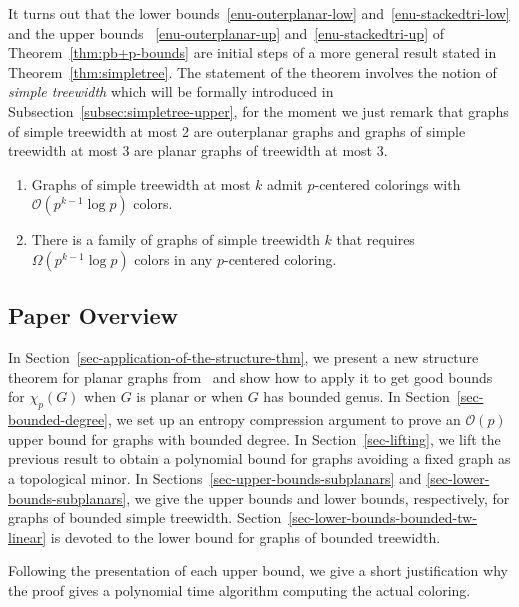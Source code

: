It turns out that the lower bounds~\ref{enu-outerplanar-low} and~\ref{enu-stackedtri-low}
and the upper bounds ~\ref{enu-outerplanar-up} and~\ref{enu-stackedtri-up} of Theorem~\ref{thm:pb+p-bounds} are initial steps of a more general result stated in Theorem~\ref{thm:simpletree}.
The statement of the theorem involves the notion of
\emph{simple treewidth} which will be formally introduced in
Subsection~\ref{subsec:simpletree-upper}, for the moment we just remark that
graphs of simple treewidth at most 2 are outerplanar graphs and graphs of
simple treewidth at most 3 are planar graphs of treewidth at most 3.

\begin{theorem}\label{thm:simpletree}\hfill
  \begin{enumerate}[label=\textup{(\roman*)},nosep]
  \item \label{enu-simpletree-up}
    Graphs of simple treewidth at most $k$ admit $p$-centered colorings
    with $\mathcal{O}(p^{k-1}\log p)$ colors.
  \item \label{enu-simpletree-low}
    There is a family of graphs of simple treewidth $k$ that requires
    $\Omega(p^{k-1}\log p)$ colors in any $p$-centered coloring.
  \end{enumerate} 
\end{theorem}

\subsection{Paper Overview}  In
Section~\ref{sec-application-of-the-structure-thm}, we present a new structure
theorem for planar graphs from~\cite{DJMMUW-queues} and show how to apply it
to get good bounds for $\chi_p(G)$ when $G$ is planar or when $G$ has bounded
genus.  In Section~\ref{sec-bounded-degree}, we set up an entropy compression
argument to prove an $\mathcal{O}(p)$ upper bound for graphs with bounded degree.  In
Section~\ref{sec-lifting}, we lift the previous result to obtain a polynomial
bound for graphs avoiding a fixed graph as a topological minor.  In
Sections~\ref{sec-upper-bounds-subplanars} and
\ref{sec-lower-bounds-subplanars}, we give the upper bounds and lower bounds,
respectively, for graphs of bounded simple treewidth.
Section~\ref{sec-lower-bounds-bounded-tw-linear} is devoted to the lower bound
for graphs of bounded treewidth.

Following the presentation of each upper bound, we give a short justification 
why the proof gives a polynomial time algorithm computing the actual coloring.

